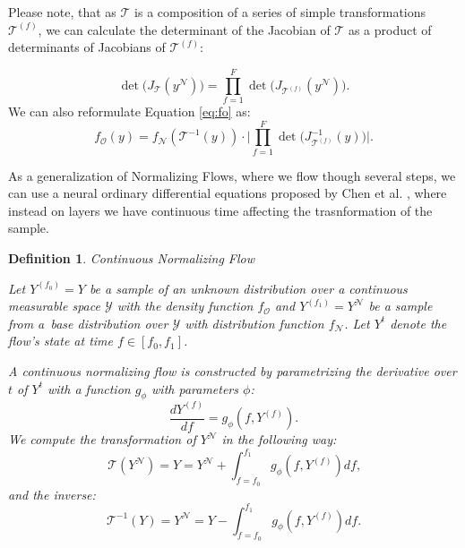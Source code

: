 \documentclass[shortabstract]{iithesis}
\newtheorem{definition}{Definition}
\begin{document}
Please note, that as $\mathcal{T}$ is a composition of a series of simple transformations $\mathcal T^{(f)}$, we can calculate the determinant of the Jacobian of $\mathcal{T}$ as a product of determinants of Jacobians of $\mathcal T^{(f)}$:

\begin{equation*}
    \det \big(J_{\mathcal T}(y^{\mathcal N})\big) = \prod_{f=1}^F \det \big(J_{\mathcal T^{(f)}}(y^{\mathcal N})\big)\text{.}
\end{equation*}
We can also reformulate Equation \ref{eq:fo} as:
\begin{equation*}
    f_{\mathcal O} (y) = f_{\mathcal N} (\mathcal T^{-1}(y)) \cdot \Big| \prod_{f=1}^F \det \big(J^{-1}_{\mathcal T^{(f)}}(y)\big) \Big|\text{.}
\end{equation*}

As a generalization of Normalizing Flows, where we flow though several steps, we can use a neural ordinary differential equations proposed by Chen et al. \cite{nn_ode}, where instead on layers we have continuous time affecting the trasnformation of the sample. 

\begin{definition} {Continuous Normalizing Flow}

    Let $Y^{(f_0)}=Y$ be a sample of an unknown distribution over a continuous measurable space $\mathcal Y$ with the density function $f_{\mathcal O}$ and $Y^{(f_1)}=Y^{\mathcal N}$ be a sample from a~base distribution over $\mathcal Y$ with distribution function $f_{\mathcal N}$. Let $Y^{t}$ denote the flow's state at time $f \in [f_0, f_1]$. 

    A continuous normalizing flow is constructed by parametrizing the derivative over $t$ of $Y^t$ with a function $g_{\phi}$ with parameters $\phi$:
    \begin{equation*}
        \frac{dY^{(f)}}{df} = g_{\phi} (f, Y^{(f)})\text{.}
    \end{equation*}
    \linebreak
    We compute the transformation of $Y^{\mathcal N}$ in the following way:
    \begin{equation*}
        \mathcal T (Y^{\mathcal N}) = Y = Y^{\mathcal N} + \int_{f=f_0}^{f_1} g_{\phi} (f, Y^{(f)}) df\text{,}
    \end{equation*}
\linebreak
    and the inverse:
    \begin{equation*}
        \mathcal T^{-1} (Y) = Y^{\mathcal N} = Y - \int_{f=f_0}^{f_1} g_{\phi} (f, Y^{(f)}) df\text{.}
    \end{equation*}
\end{definition}
\end{document}
